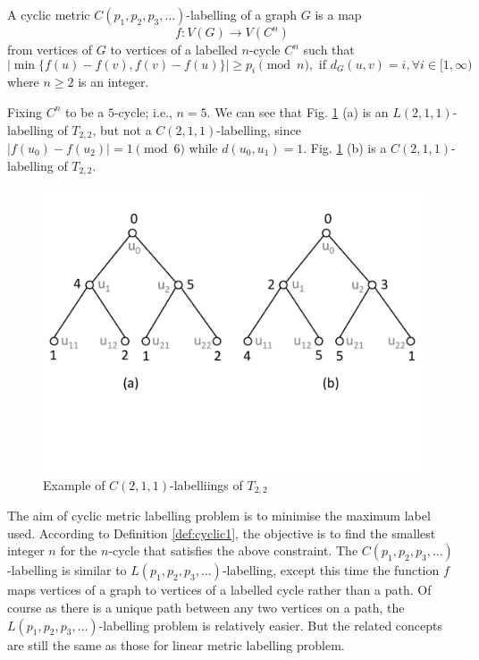 \begin{definition}
\label{def:cyclic1}
A cyclic metric $C(p_1, p_2, p_3, \dots)$-labelling of a graph $G$ is a map 
\[
f : V(G) \rightarrow V(C^n) 
\] 
from vertices of $G$ to vertices of a labelled $n$-cycle $C^n$ such that
\[
|\min\{f(u)-f(v), f(v) - f(u)\}| \ge p_{i}\pmod{n}, \text{ if } d_{G}(u, v) = i, \forall i \in [1, \infty) 
\]
where $n \ge 2$ is an integer.  
\end{definition}
\begin{example}
Fixing $C^n$ to be a $5$-cycle; i.e.,  $n = 5$. We can see that Fig. \ref{cyclic labelling} (a) is an $L(2,1,1)$-labelling of $T_{2,2}$, but not a $C(2,1,1)$-labelling, since $|f(u_0) - f(u_2)| = 1 \pmod{6}$ while $d(u_0, u_1) = 1$. Fig. \ref{cyclic labelling} (b) is a $C(2,1,1)$-labelling of $T_{2,2}$. 
\begin{figure}
 \centering
      \vspace{-10pt}
    \includegraphics[scale=0.4]{../figures/fig4-2.pdf}
        \vspace{-50pt}
 \caption{Example of $C(2,1,1)$-labelliings of $T_{2,2}$}
  \label{cyclic labelling}
\end{figure}
\end{example}

The aim of cyclic metric labelling problem is to minimise the maximum label used. According to Definition \ref{def:cyclic1}, the objective is to find the smallest integer $n$ for the $n$-cycle that satisfies the above constraint. The $C(p_1, p_2, p_3, \dots)$-labelling is similar to $L(p_1, p_2, p_3, \dots)$-labelling, except this time the function $f$ maps vertices of a graph to vertices of a labelled cycle rather than a path. Of course as there is a unique path between any two vertices on a path, the $L(p_1, p_2, p_3, \dots)$-labelling problem is relatively easier. But the related concepts are still the same as those for linear metric labelling problem.

